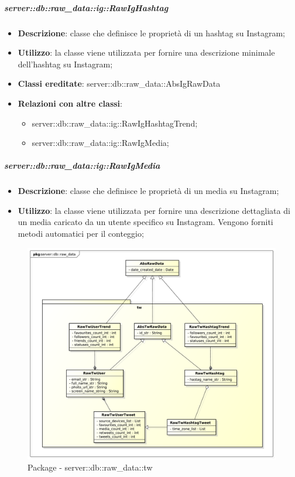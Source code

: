 		\subparagraph{server::db::raw\_data::ig::RawIgHashtag} %
		\label{subp:server_db_raw_data_ig_rawighashtag}
			\begin{itemize}
				\item \textbf{Descrizione}: classe che definisce le proprietà di un hashtag su Instagram;
				\item \textbf{Utilizzo}: la classe viene utilizzata per fornire una descrizione minimale dell'hashtag su Instagram;
				\item \textbf{Classi ereditate}: server::db::raw\_data::AbsIgRawData
				\item \textbf{Relazioni con altre classi}:
					\begin{itemize}
						\item server::db::raw\_data::ig::RawIgHashtagTrend;
						\item server::db::raw\_data::ig::RawIgMedia;
					\end{itemize}
			\end{itemize}


		\subparagraph{server::db::raw\_data::ig::RawIgMedia} %
		\label{subp:server_db_raw_data_ig_rawigmedia}
			\begin{itemize}
				\item \textbf{Descrizione}: classe che definisce le proprietà di un media su Instagram;
				\item \textbf{Utilizzo}: la classe viene utilizzata per fornire una descrizione dettagliata di un media caricato da un utente specifico su Instagram. Vengono forniti metodi automatici per il conteggio;
			\end{itemize}




		\begin{figure}[htbp]
			\centering
			\centerline{\includegraphics[scale=0.45]{./images/server/raw_data_tw.pdf}}
			\caption{Package - server::db::raw\_data::tw}
		\end{figure}

